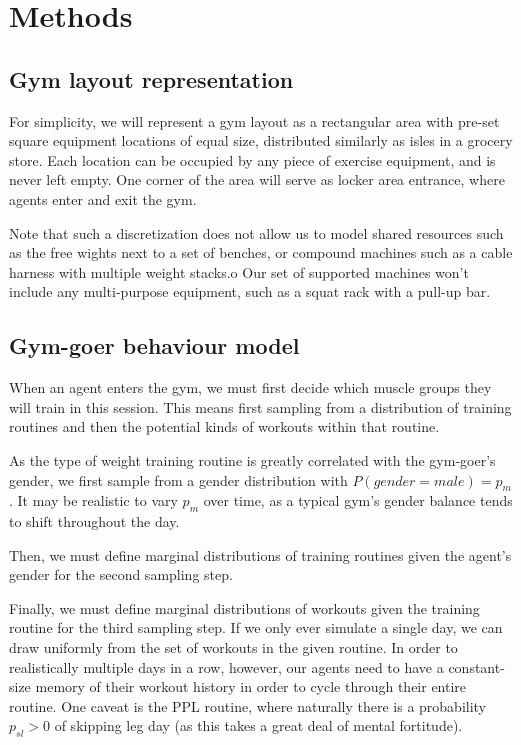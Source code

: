 \documentclass[9pt]{pnas-new}
\begin{document}
\section*{Methods}

\subsection*{Gym layout representation}
For simplicity, we will represent a gym layout as a rectangular area with pre-set square equipment locations of equal size, distributed similarly as isles in a grocery store.
Each location can be occupied by any piece of exercise equipment, and is never left empty.
One corner of the area will serve as locker area entrance, where agents enter and exit the gym.

Note that such a discretization does not allow us to model shared resources such as the free wights next to a set of benches, or compound machines such as a cable harness with multiple weight stacks.o
Our set of supported machines won't include any multi-purpose equipment, such as a squat rack with a pull-up bar.

\subsection*{Gym-goer behaviour model}

When an agent enters the gym, we must first decide which muscle groups they will train in this session. This means first sampling from a distribution of training routines and then the potential kinds of workouts within that routine.

As the type of weight training routine is greatly correlated with the gym-goer's gender, we first sample from a gender distribution with $P(gender = male) = p_m$. It may be realistic to vary $p_m$ over time, as a typical gym's gender balance tends to shift throughout the day.

Then, we must define marginal distributions of training routines given the agent's gender for the second sampling step.

Finally, we must define marginal distributions of workouts given the training routine for the third sampling step.
If we only ever simulate a single day, we can draw uniformly from the set of workouts in the given routine. In order to realistically multiple days in a row, however, our agents need to have a constant-size memory of their workout history in order to cycle through their entire routine.
One caveat is the PPL routine, where naturally there is a probability $p_{sl} > 0$ of skipping leg day (as this takes a great deal of mental fortitude).
\end{document}
